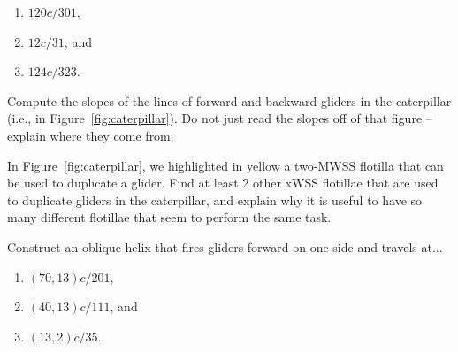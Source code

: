 \begin{multicols}{2}
\begin{problem}
	\begin{enumerate}[label=\bf\color{ocre}(\alph*)]
		\item {} $120c/301$,%
		
		\item {} $12c/31$, and%
		
		\item {} $124c/323$.%
	\end{enumerate}
\end{problem}


\mfilbreak


\begin{problemstar}\label{exer:caterpillar_glider_slopes} 
	Compute the slopes of the lines of forward and backward gliders in the caterpillar (i.e., in Figure~\ref{fig:caterpillar}). Do not just read the slopes off of that figure -- explain where they come from.
\end{problemstar}


\mfilbreak


\begin{problem}\label{exer:caterpillar_glider_duplicate} 
	In Figure~\ref{fig:caterpillar}, we highlighted in yellow a two-MWSS flotilla that can be used to duplicate a glider. Find at least 2 other xWSS flotillae that are used to duplicate gliders in the caterpillar, and explain why it is useful to have so many different flotillae that seem to perform the same task.
\end{problem}


\mfilbreak


\begin{problem}\label{exer:construct_oblique_helix}
	Construct an oblique helix that fires gliders forward on one side and travels at...\smallskip
	
	\begin{enumerate}[label=\bf\color{ocre}(\alph*)]
		\item {} $(70,13)c/201$,%
		
		\item {} $(40,13)c/111$, and%
		
		\item {} $(13,2)c/35$.%
	\end{enumerate}
\end{problem}



\end{multicols}
